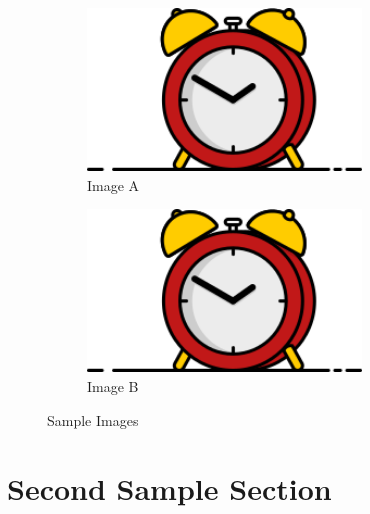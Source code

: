 \documentclass[twoside]{report}
\numberwithin{equation}{section}		%
\numberwithin{figure}{section}			%
\numberwithin{table}{section}
\begin{document}
    \begin{figure}
        \centering
        \begin{subfigure}[b]{0.45\textwidth}
            \centering
            \includegraphics[width=0.8\textwidth,totalheight=\textheight,keepaspectratio]{front_page_logo.png}
            \caption{Image A}
        \end{subfigure}
        \hfill
        \begin{subfigure}[b]{0.45\textwidth}
            \centering
            \includegraphics[width=0.8\textwidth,totalheight=\textheight,keepaspectratio]{front_page_logo.png}
            \caption{Image B}
        \end{subfigure}
        \caption{Sample Images}
    \end{figure}

    \section{Second Sample Section}
    \lipsum[1-3]
\end{document}
